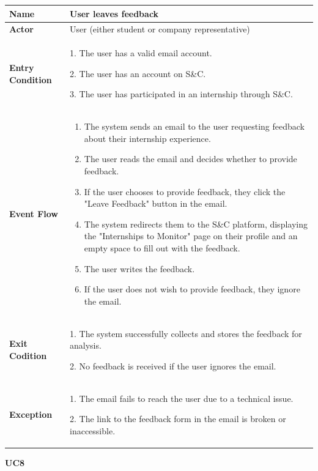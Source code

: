 \begin{longtable}{|p{}|p{}|}
\hline
\textbf{Name} &  User leaves feedback\\
\hline
\textbf{Actor} &  User (either student or company representative)\\
\hline
\textbf{Entry Condition} &  
1. The user has a valid email account.

2. The user has an account on S\&C.

3. The user has participated in an internship through S\&C.\\
\hline
\textbf{Event Flow} &  
\begin{enumerate}
    \item The system sends an email to the user requesting feedback about their internship experience.
    \item The user reads the email and decides whether to provide feedback.
    \item If the user chooses to provide feedback, they click the "Leave Feedback" button in the email.
    \item The system redirects them to the S\&C platform, displaying the "Internships to Monitor" page on their profile and an empty space to fill out with the feedback.	
    \item The user writes the feedback.
    \item  If the user does not wish to provide feedback, they ignore the email.
\end{enumerate}\\
\hline
\textbf{Exit Codition} & 
1. The system successfully collects and stores the feedback for analysis.

2. No feedback is received if the user ignores the email.\\
\hline
\textbf{Exception} &  
1. The email fails to reach the user due to a technical issue.	

2. The link to the feedback form in the email is broken or inaccessible.\\
\hline
\end{longtable}

\textbf{UC8}

